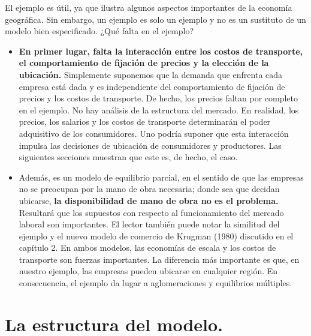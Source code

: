 El ejemplo es útil, ya que ilustra algunos aspectos importantes de la economía geográfica. Sin embargo, un ejemplo es solo un ejemplo y no es un sustituto de un modelo bien especificado. ¿Qué falta en el ejemplo?\\
\begin{itemize}
    \item \textbf{En primer lugar, falta la interacción entre los costos de transporte, el comportamiento de fijación de precios y la elección de la ubicación.} Simplemente suponemos que la demanda que enfrenta cada empresa está dada y es independiente del comportamiento de fijación de precios y los costos de transporte. De hecho, los precios faltan por completo en el ejemplo. No hay análisis de la estructura del mercado. En realidad, los precios, los salarios y los costos de transporte determinarán el poder adquisitivo de los consumidores. Uno podría suponer que esta interacción impulsa las decisiones de ubicación de consumidores y productores. Las siguientes secciones muestran que este es, de hecho, el caso.
    \item Además, es un modelo de equilibrio parcial, en el sentido de que las empresas no se preocupan por la mano de obra necesaria; donde sea que decidan ubicarse, \textbf{la disponibilidad de mano de obra no es el problema.} Resultará que los supuestos con respecto al funcionamiento del mercado laboral son importantes. El lector también puede notar la similitud del ejemplo y el nuevo modelo de comercio de Krugman (1980) discutido en el capítulo 2. En ambos modelos, las economías de escala y los costos de transporte son fuerzas importantes. La diferencia más importante es que, en nuestro ejemplo, las empresas pueden ubicarse en cualquier región. En consecuencia, el ejemplo da lugar a aglomeraciones y equilibrios múltiples.
\end{itemize}

\section{La estructura del modelo.}

